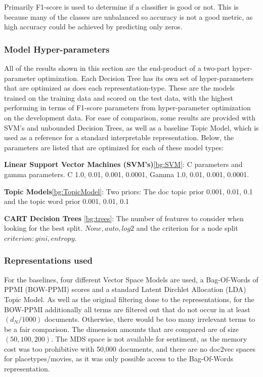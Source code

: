 Primarily F1-score  is used to determine if a classifier is good or not. This is because many of the classes are unbalanced so accuracy is not a good metric, as high accuracy could be achieved by predicting only zeros.  

\subsubsection{Model Hyper-parameters}\label{ch3:hyperparam}

All of the results shown in this section are the end-product of a two-part hyper-parameter optimization. Each Decision Tree has its own set of hyper-parameters that are optimized as does each representation-type. These are the models trained on the training data and scored on the test data, with the highest performing in terms of F1-score parameters from hyper-parameter optimization on the development data. For ease of comparison, some results are provided with SVM's and unbounded Decision Trees, as well as a baseline Topic Model, which is used as a reference for a standard interpretable representation. Below, the parameters are listed that are optimized for each of these model types:

\textbf{Linear Support Vector Machines (SVM's)}\ref{bg:SVM}: C parameters and gamma parameters.
C {1.0, 0.01, 0.001, 0.0001}, Gamma {1.0, 0.01, 0.001, 0.0001}.

\textbf{Topic Models}\ref{bg:TopicModel}: Two priors: The doc topic prior {0.001, 0.01, 0.1} and the topic word prior {0.001, 0.01, 0.1}

\textbf{CART Decision Trees }\ref{bg:trees}: The number of features to consider when looking for the best split. $None, auto, log2$ and the criterion for a node split $criterion: gini, entropy$.
	
	
\subsubsection{Representations used}

For the baselines, four different Vector Space Models are used, a Bag-Of-Words of PPMI (BOW-PPMI) scores and a standard Latent Dirchlet Allocation (LDA) Topic Model. As well as the original filtering done to the representations, for the BOW-PPMI additionally all terms are filtered out that do not occur in at least $(d_N / 1000)$ documents. Otherwise, there would be too many irrelevant terms to be a fair comparison. The dimension amounts that are compared are of size $(50, 100, 200)$.
The MDS space is not available for sentiment, as the memory cost was too prohibitive with 50,000 documents, and there are no doc2vec spaces for placetypes/movies, as it was only possible access to the Bag-Of-Words representation.

